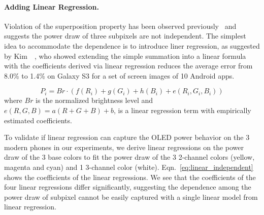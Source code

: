 

\paragraph{Adding Linear Regression.}
\label{subsec:LMLR}
Violation of the superposition property has been observed
previously~\cite{mittal2012empowering,kim2013runtime}
and suggests the power draw of three subpixels
are not independent.
The simplest idea to accommodate the dependence is to introduce liner regression,
as suggested by Kim~\etal~\cite{kim2013runtime},
who showed extending the
simple summation into a linear formula with the coefficients derived
via linear regression reduces the average error from 8.0\% to 1.4\% on
Galaxy S3 for a set of screen images of 10 Android apps.

\begin{equation}
P_i = Br\cdot(f(R_{i}) + g(G_{i}) + h(B_{i}) + e(R_{i},G_{i},B_{i}))
\label{eq:linear_equation2}
\end{equation}
\noindent
where $Br$ is the normalized brightness level and $e(R,G,B)= a(R+G+B)
+ b$, is a linear regression term with empirically estimated
coefficients. \
\fi

To validate if linear regression can capture the OLED power behavior
on the 3 modern phones in our experiments, we derive linear
regressions on the power draw of the 3 base colors to fit the power
draw of the 3 2-channel colors (yellow, magenta and cyan) and 1 3-channel color (white).
Eqn.~\ref{eq:linear_independent} shows the coefficients of the linear
regressions.  We see that the coefficients of the four linear
regressions differ significantly, suggesting the dependence among the
power draw of subpixel cannot be easily captured with a single linear
model from linear regression.

